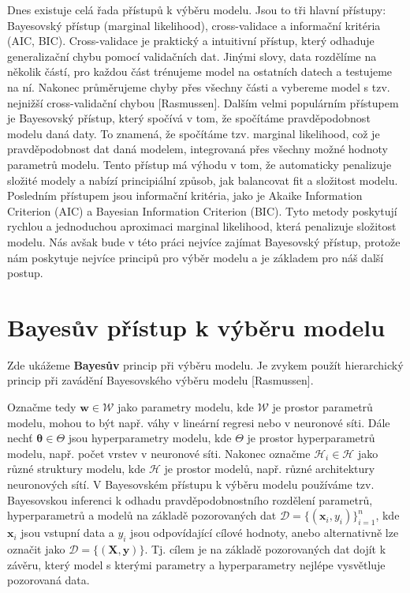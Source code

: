 Dnes existuje celá řada přístupů k výběru modelu.
Jsou to tři hlavní přístupy: Bayesovský přístup (marginal likelihood), cross-validace a informační kritéria (AIC, BIC).
Cross-validace je praktický a intuitivní přístup, který odhaduje generalizační chybu pomocí validačních dat.
Jinými slovy, data rozdělíme na několik částí, pro každou část trénujeme model na ostatních datech a testujeme na ní.
Nakonec průměrujeme chyby přes všechny části a vybereme model s tzv. nejnižší cross-validační chybou [Rasmussen].
Dalším velmi populárním přístupem je Bayesovský přístup, který spočívá v tom, že spočítáme pravděpodobnost modelu daná daty.
To znamená, že spočítáme tzv. marginal likelihood, což je pravděpodobnost dat daná modelem, integrovaná přes všechny možné hodnoty parametrů modelu.
Tento přístup má výhodu v tom, že automaticky penalizuje složité modely a nabízí principiální způsob, jak balancovat fit a složitost modelu.
Posledním přístupem jsou informační kritéria, jako je Akaike Information Criterion (AIC) a Bayesian Information Criterion (BIC).
Tyto metody poskytují rychlou a jednoduchou aproximaci marginal likelihood, která penalizuje složitost modelu.
Nás avšak bude v této práci nejvíce zajímat Bayesovský přístup, protože nám poskytuje nejvíce principů pro výběr modelu a je základem pro náš další postup.

\section{Bayesův přístup k výběru modelu}

Zde ukážeme \textbf{Bayesův} princip při výběru modelu.
Je zvykem použít hierarchický princip při zavádění Bayesovského výběru modelu [Rasmussen].
\par

Označme tedy $\mathbf{w} \in \mathcal{W}$ jako parametry modelu, kde $\mathcal{W}$ je prostor parametrů modelu, mohou to být např. váhy v lineární regresi nebo v neuronové síti.
Dále nechť $\boldsymbol{\theta} \in \Theta $ jsou hyperparametry modelu, kde $\Theta$ je prostor hyperparametrů modelu, např. počet vrstev v neuronové síti.
Nakonec označme $\mathcal{H}_i \in \mathcal{H}$ jako různé struktury modelu, kde $\mathcal{H}$ je prostor modelů, např. různé architektury neuronových sítí.
V Bayesovském přístupu k výběru modelu používáme tzv. Bayesovskou inferenci k odhadu pravděpodobnostního rozdělení parametrů, hyperparametrů a modelů na základě pozorovaných dat $\mathcal{D} = \{(\mathbf{x}_i, y_i)\}_{i=1}^n$, kde $\mathbf{x}_i$ jsou vstupní data a $y_i$ jsou odpovídající cílové hodnoty, anebo alternativně lze označit jako $\mathcal{D} = \{(\mathbf{X}, \mathbf{y})\}$.
Tj. cílem je na základě pozorovaných dat dojít k závěru, který model s kterými parametry a hyperparametry nejlépe vysvětluje pozorovaná data.
\par

